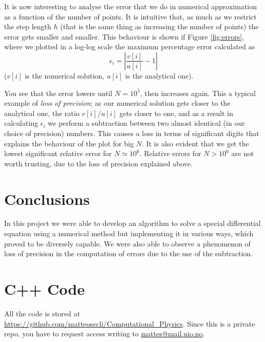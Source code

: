 \documentclass {article}
\begin{document}
It is now interesting to analyse the error that we do in numerical approximation as a function of the number of points. It is intuitive that, as much as we restrict the step length $h$ (that is the same thing as increasing the number of points) the error gets smaller and smaller. This behaviour is shown if Figure \ref{fig:errors}, where we plotted in a log-log scale the maximum percentage error calculated as
\begin{equation*}
	\epsilon_i = \left| \frac{v[i]}{u[i]} - 1 \right|
\end{equation*}
($v[i]$ is the numerical solution, $u[i]$ is the analytical one).

You see that the error lowers until $N = 10^{5}$, then increases again. This a typical example of \emph{loss of precision}; as our numerical solution gets closer to the analytical one, the ratio $v[i]/u[i]$ gets closer to one, and as a result in calculating $\epsilon_i$ we perform a subtraction between two almost identical (in our choice of precision) numbers. This causes a loss in terms of significant digits that explains the behaviour of the plot for big $N$. It is also evident that we get the lowest significant relative error for $N \simeq 10^{6}$. Relative errors for $N > 10^{6}$ are not worth trusting, due to the loss of precision explained above.

\section{Conclusions}

In this project we were able to develop an algorithm to solve a special differential equation using a numerical method but implementing it in various ways, which proved to be diversely capable. We were also able to observe a phenomenon of loss of precision in the computation of errors due to the use of the subtraction. 

\newpage
\section{C++ Code}
\label{sec:code}

All the code is stored at \url{https://github.com/matteosecli/Computational_Physics}. Since this is a private repo, you have to request access writing to \href{mailto:mattes@mail.uio.no}{mattes@mail.uio.no}.
\end{document}

